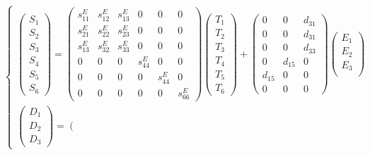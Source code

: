 \documentclass[dvipdfmx,12pt,a4paper]{jreport}
\begin{document}
			\begin{equation}
				\begin{cases}
				\left(
				\begin{array}{c}
					S_1 \\
					S_2 \\
					S_3 \\
					S_4 \\
					S_5 \\
					S_6 
				\end{array}
				\right)=\left(
				\begin{array}{cccccc}
				s^E_{11} & s^E_{12} & s^E_{13} & 0 & 0 & 0 \\
				s^E_{21} & s^E_{22} & s^E_{23} & 0 & 0 & 0 \\
				s^E_{13} & s^E_{32} & s^E_{33} & 0 & 0 & 0 \\
				0 & 0 & 0 & s^E_{44} & 0 & 0 \\
				0 & 0 & 0 & 0 & s^E_{44} & 0 \\
				0 & 0 & 0 & 0 & 0 & s^E_{66} 
				\end{array}
				\right)
				\left(
				\begin{array}{c}
					T_1 \\
					T_2 \\
					T_3 \\
					T_4 \\
					T_5 \\
					T_6 
				\end{array}
				\right)+
				\left(
				\begin{array}{ccc}
					0&0	&d_{31} \\
					0&0	&d_{31} \\
					0&0	&d_{33} \\
					0&d_{15}&0 \\
					d_{15}&0&0 \\
					0&0	&0 
				\end{array}
				\right)
				\left(
				\begin{array}{c}
					E_1 \\
					E_2 \\
					E_3 \\
				\end{array}
				\right) & \\
				\left(
				\begin{array}{c}
					D_1 \\
					D_2 \\
					D_3
				\end{array}\right)=\left(
				\begin{array}{cccccc}

\end{array}
\end{cases}
\end{equation}
\end{document}
